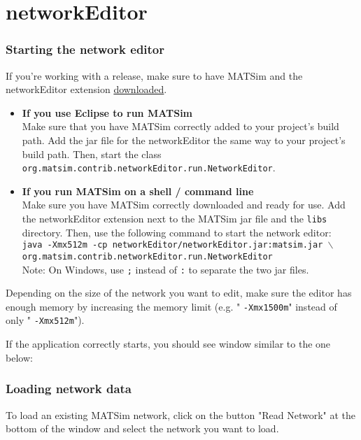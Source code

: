 \documentclass[a4paper,11pt]{report}
\begin{document}
\vfill\eject
\section{networkEditor}

\subsubsection{Starting the network editor}

If you're working with a release, make sure to have MATSim and the networkEditor extension \href{http://www.matsim.org/downloads}{downloaded}.
\begin{itemize}
	\item \textbf{If you use Eclipse to run MATSim}
\\     Make  sure that you have MATSim correctly added to your project's build path.  Add the jar file for the networkEditor the same way to your project's  build path. Then, start the class 
\texttt{org.matsim.contrib.networkEditor.run.NetworkEditor}.
	\item \textbf{If you run MATSim on a shell / command line}
\\      Make sure you have MATSim correctly downloaded and ready for use. Add  the networkEditor extension next to the MATSim jar file and the 
\texttt{libs} directory. Then, use the following command to start the network editor:
\\
\texttt{java -Xmx512m -cp networkEditor/networkEditor.jar:matsim.jar $\backslash$
\\      org.matsim.contrib.networkEditor.run.NetworkEditor}
\\Note: On Windows, use 
\texttt{;} instead of 
\texttt{:} to separate the two jar files.
\end{itemize}

Depending on the size of the network you want to edit, make sure  the editor has enough memory by increasing the memory limit (e.g. "
\texttt{-Xmx1500m}" instead of only "
\texttt{-Xmx512m}").

If the application correctly starts, you should see window similar to the one below:



\subsubsection{Loading network data}

To load an existing MATSim network, click on the button "Read  Network" at the bottom of the window and select the network you want to  load.
\end{document}
